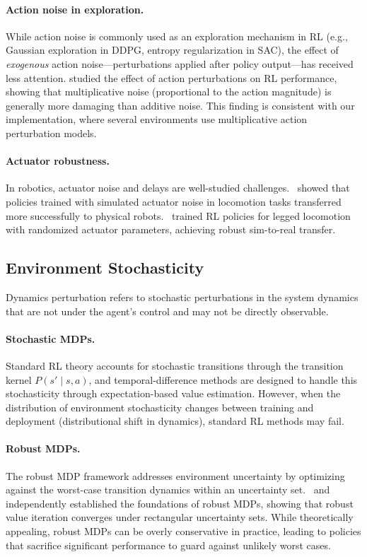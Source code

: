 \paragraph{Action noise in exploration.} While action noise is commonly used as an exploration mechanism in RL (e.g., Gaussian exploration in DDPG, entropy regularization in SAC), the effect of \emph{exogenous} action noise---perturbations applied after policy output---has received less attention. \citet{tessler2019action} studied the effect of action perturbations on RL performance, showing that multiplicative noise (proportional to the action magnitude) is generally more damaging than additive noise. This finding is consistent with our implementation, where several environments use multiplicative action perturbation models.

\paragraph{Actuator robustness.} In robotics, actuator noise and delays are well-studied challenges.~\citet{tan2018simtoreal} showed that policies trained with simulated actuator noise in locomotion tasks transferred more successfully to physical robots.~\citet{hwangbo2019legged} trained RL policies for legged locomotion with randomized actuator parameters, achieving robust sim-to-real transfer.

\subsection{Environment Stochasticity}

Dynamics perturbation refers to stochastic perturbations in the system dynamics that are not under the agent's control and may not be directly observable.

\paragraph{Stochastic MDPs.} Standard RL theory accounts for stochastic transitions through the transition kernel $P(s' \mid s, a)$, and temporal-difference methods are designed to handle this stochasticity through expectation-based value estimation. However, when the distribution of environment stochasticity changes between training and deployment (distributional shift in dynamics), standard RL methods may fail.

\paragraph{Robust MDPs.} The robust MDP framework addresses environment uncertainty by optimizing against the worst-case transition dynamics within an uncertainty set.~\citet{iyengar2005robust} and~\citet{nilim2005robust} independently established the foundations of robust MDPs, showing that robust value iteration converges under rectangular uncertainty sets. While theoretically appealing, robust MDPs can be overly conservative in practice, leading to policies that sacrifice significant performance to guard against unlikely worst cases.


